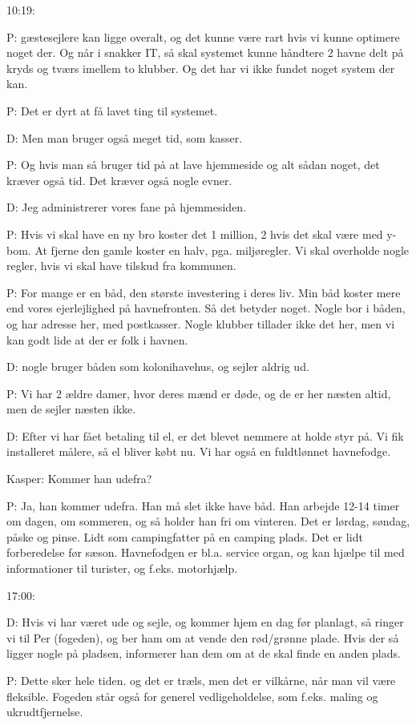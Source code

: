 10:19:

P: gæstesejlere kan ligge overalt, og det kunne være rart hvis vi kunne optimere noget der. Og når i snakker IT, så skal systemet kunne håndtere 2 havne delt på kryds og tværs imellem to klubber. Og det har vi ikke fundet noget system der kan.

P: Det er dyrt at få lavet ting til systemet.

D: Men man bruger også meget tid, som kasser.

P: Og hvis man så bruger tid på at lave hjemmeside og alt sådan noget, det kræver også tid. Det kræver også nogle evner.

D: Jeg administrerer vores fane på hjemmesiden.

P: Hvis vi skal have en ny bro koster det 1 million, 2 hvis det skal være med y-bom. At fjerne den gamle koster en halv, pga. miljøregler. Vi skal overholde nogle regler, hvis vi skal have tilskud fra kommunen.

P: For mange er en båd, den største investering i deres liv. Min båd koster mere end vores ejerlejlighed på havnefronten. Så det betyder noget. Nogle bor i båden, og har adresse her, med postkasser. Nogle klubber tillader ikke det her, men vi kan godt lide at der er folk i havnen.

D: nogle bruger båden som kolonihavehus, og sejler aldrig ud.

P: Vi har 2 ældre damer, hvor deres mænd er døde, og de er her næsten altid, men de sejler næsten ikke.


D: Efter vi har fået betaling til el, er det blevet nemmere at holde styr på. Vi fik installeret målere, så el bliver købt nu. Vi har også en fuldtlønnet havnefodge.

Kasper: Kommer han udefra?

P: Ja, han kommer udefra. Han må slet ikke have båd. Han arbejde 12-14 timer om dagen, om sommeren, og så holder han fri om vinteren. Det er lørdag, søndag, påske og pinse. Lidt som campingfatter på en camping plads. Det er lidt forberedelse før sæson. Havnefodgen er bl.a. service organ, og kan hjælpe til med informationer til turister, og f.eks. motorhjælp.

17:00:

D: Hvis vi har været ude og sejle, og kommer hjem en dag før planlagt, så ringer vi til Per (fogeden), og ber ham om at vende den rød/grønne plade. Hvis der så ligger nogle på pladsen, informerer han dem om at de skal finde en anden plads.

P: Dette sker hele tiden. og det er træls, men det er vilkårne, når man vil være fleksible. Fogeden står også for generel vedligeholdelse, som f.eks. maling og ukrudtfjernelse.


